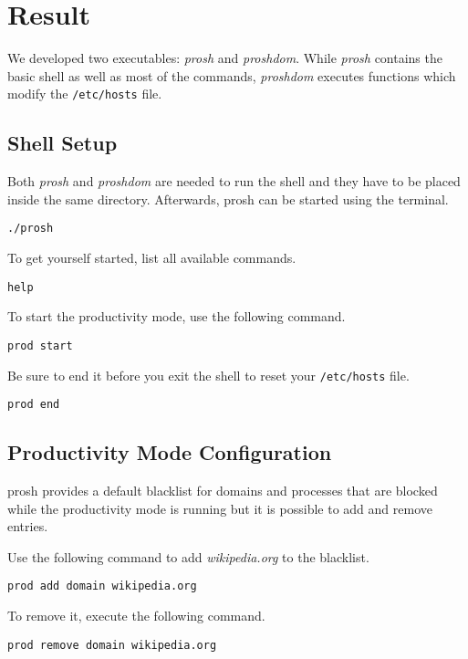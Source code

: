 \documentclass{article}
\begin{document}
\section{Result}

We developed two executables: \textit{prosh} and \textit{proshdom}. While \textit{prosh} contains the basic shell as well as most of the commands, \textit{proshdom} executes functions which modify the \texttt{/etc/hosts} file. 

\subsection{Shell Setup}

Both \textit{prosh} and \textit{proshdom} are needed to run the shell and they have to be placed inside the same directory. Afterwards, prosh can be started using the terminal.
\begin{lstlisting}[numbers=none]
./prosh
\end{lstlisting}

To get yourself started, list all available commands.
\begin{lstlisting}[numbers=none]
help
\end{lstlisting}

To start the productivity mode, use the following command.
\begin{lstlisting}[numbers=none]
prod start
\end{lstlisting}

Be sure to end it before you exit the shell to reset your \texttt{/etc/hosts} file.
\begin{lstlisting}[numbers=none]
prod end
\end{lstlisting}

\subsection{Productivity Mode Configuration}

prosh provides a default blacklist for domains and processes that are blocked while the productivity mode is running but it is possible to add and remove entries.

Use the following command to add \textit{wikipedia.org} to the blacklist.
\begin{lstlisting}[numbers=none]
prod add domain wikipedia.org
\end{lstlisting}

To remove it, execute the following command.
\begin{lstlisting}[numbers=none]
prod remove domain wikipedia.org
\end{lstlisting}
\end{document}
